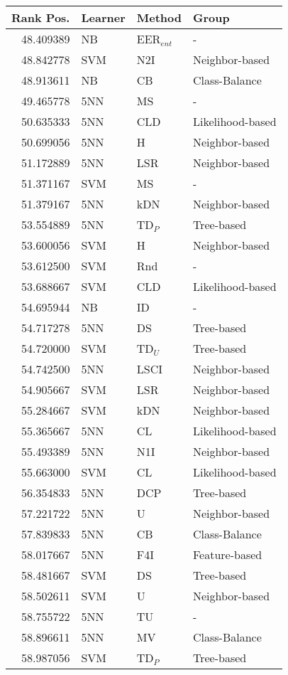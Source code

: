 \begin{tabular}{rlll}
\toprule
Rank Pos. & Learner & Method & Group \\
\midrule
48.409389 & NB & EER$_{ent}$ & - \\
48.842778 & SVM & N2I & Neighbor-based \\
48.913611 & NB & CB & Class-Balance \\
49.465778 & 5NN & MS & - \\
50.635333 & 5NN & CLD & Likelihood-based \\
50.699056 & 5NN & H & Neighbor-based \\
51.172889 & 5NN & LSR & Neighbor-based \\
51.371167 & SVM & MS & - \\
51.379167 & 5NN & kDN & Neighbor-based \\
53.554889 & 5NN & TD$_P$ & Tree-based \\
53.600056 & SVM & H & Neighbor-based \\
53.612500 & SVM & Rnd & - \\
53.688667 & SVM & CLD & Likelihood-based \\
54.695944 & NB & ID & - \\
54.717278 & 5NN & DS & Tree-based \\
54.720000 & SVM & TD$_U$ & Tree-based \\
54.742500 & 5NN & LSCI & Neighbor-based \\
54.905667 & SVM & LSR & Neighbor-based \\
55.284667 & SVM & kDN & Neighbor-based \\
55.365667 & 5NN & CL & Likelihood-based \\
55.493389 & 5NN & N1I & Neighbor-based \\
55.663000 & SVM & CL & Likelihood-based \\
56.354833 & 5NN & DCP & Tree-based \\
57.221722 & 5NN & U & Neighbor-based \\
57.839833 & 5NN & CB & Class-Balance \\
58.017667 & 5NN & F4I & Feature-based \\
58.481667 & SVM & DS & Tree-based \\
58.502611 & SVM & U & Neighbor-based \\
58.755722 & 5NN & TU & - \\
58.896611 & 5NN & MV & Class-Balance \\
58.987056 & SVM & TD$_P$ & Tree-based \\

\end{tabular}
